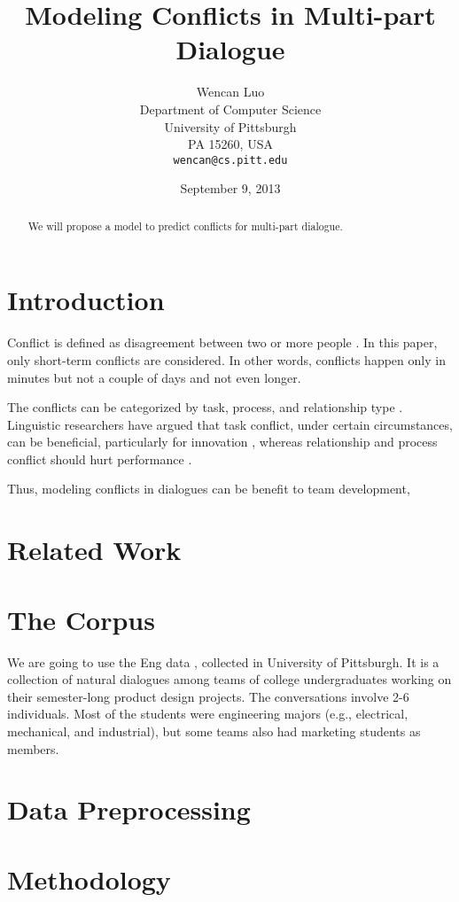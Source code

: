 \documentclass[11pt,letterpaper]{article}
\title{Modeling Conflicts in Multi-part Dialogue}
\author{Wencan Luo\\
	    Department of Computer Science\\
	    University of Pittsburgh\\
	    PA 15260, USA\\
	    {\tt wencan@cs.pitt.edu}
	  }
\date{September 9, 2013}
\begin{document}
\maketitle
\begin{abstract}
We will propose a model to predict conflicts for multi-part dialogue.

\end{abstract}

\section{Introduction}
Conflict is defined as disagreement between two or more people \cite{Paletz:2011}. In this paper, only short-term conflicts are considered. In other words, conflicts happen only in minutes but not a couple of days and not even longer.

The conflicts can be categorized by task, process, and relationship type \cite{Jehn:1995,Jehn:1997}. Linguistic researchers have argued that task conflict, under certain circumstances, can be beneficial, particularly for innovation \cite{Jehn:1997,West:2002}, whereas relationship and process conflict should hurt performance \cite{Jehn:1997}.

Thus, modeling conflicts in dialogues can be benefit to team development, 

\section{Related Work}

\section{The Corpus}

We are going to use the Eng data \cite{Jang:2012,Friedberg:2012}, collected in University of Pittsburgh.
It is a collection of natural dialogues among teams of college undergraduates working on their semester-long product design projects.
The conversations involve 2-6 individuals. Most of the students were engineering majors (e.g., electrical, mechanical, and industrial), but some teams also had marketing students as members.


\section{Data Preprocessing}

\section{Methodology}
\end{document}
